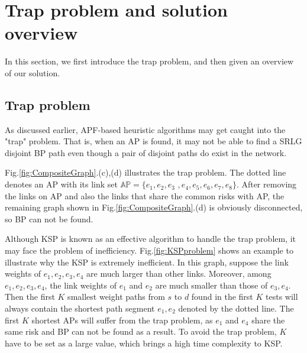 \section{Trap problem and solution overview }
\label{sec:Trap problem and solution overview }

In this section, we first introduce the trap problem, and then given an overview of our solution.
\subsection{Trap problem}

As discussed earlier, APF-based heuristic algorithms may get caught into the "trap" problem. That is, when an AP is found, it may not be able to find a SRLG disjoint BP path even though a pair of disjoint paths do exist in the network.

Fig.\ref{fig:CompositeGraph}.(c),(d) illustrates the trap problem. The dotted line denotes an AP with its link set
$\mathbb{AP}=\{e_1,e_2,e_3$ $,e_4,e_5,e_6,e_7,e_8\}$. After removing the links on AP and also the links that share the common risks with AP, the remaining graph shown in Fig.\ref{fig:CompositeGraph}.(d) is obviously disconnected, so BP can not be found.

Although KSP is known as an effective algorithm to handle the trap
problem, it may face the problem of inefficiency.  Fig.\ref{fig:KSPproblem}  shows an example to illustrate why the KSP is extremely inefficient. In this graph, suppose  the link weights of $e_1, e_2, e_3, e_4$ are much larger than other links. Moreover, among $e_1, e_2, e_3, e_4$, the link weights of $e_1$ and $e_2$ are much smaller  than those of $e_3, e_4$. Then the first $K$ smallest weight paths from $s$ to $d$ found in the first $K$ tests will always contain the shortest path segment $e_1,e_2$ denoted by the dotted line. The first $K$ shortest APs will suffer from the trap problem, as $e_1$ and $e_4$ share the same risk and BP can not be found as a result. To avoid the trap problem, $K$ have to be set as a large value, which brings a high time complexity to KSP.

